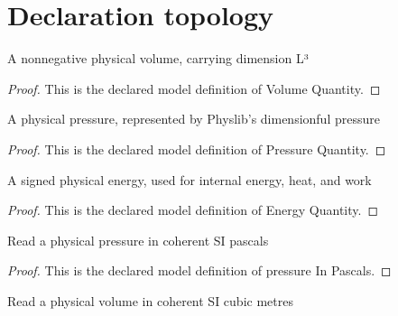 \section{Declaration topology}
\begin{definition}
  \label{def:physics:phyx-mini-0470:phyxminiproblems-problemphyxmini0470-volumequantity}
  A nonnegative physical volume, carrying dimension L³
\end{definition}
\begin{proof}
  This is the declared model definition of Volume Quantity.
\end{proof}
\begin{definition}
  \label{def:physics:phyx-mini-0470:phyxminiproblems-problemphyxmini0470-pressurequantity}
  A physical pressure, represented by Physlib's dimensionful pressure
\end{definition}
\begin{proof}
  This is the declared model definition of Pressure Quantity.
\end{proof}
\begin{definition}
  \label{def:physics:phyx-mini-0470:phyxminiproblems-problemphyxmini0470-energyquantity}
  A signed physical energy, used for internal energy, heat, and work
\end{definition}
\begin{proof}
  This is the declared model definition of Energy Quantity.
\end{proof}
\begin{definition}
  \label{def:physics:phyx-mini-0470:phyxminiproblems-problemphyxmini0470-pressureinpascals}
  Read a physical pressure in coherent SI pascals
\end{definition}
\begin{proof}
  This is the declared model definition of pressure In Pascals.
\end{proof}
\begin{definition}
  \label{def:physics:phyx-mini-0470:phyxminiproblems-problemphyxmini0470-volumeincubicmeters}
  Read a physical volume in coherent SI cubic metres
\end{definition}
